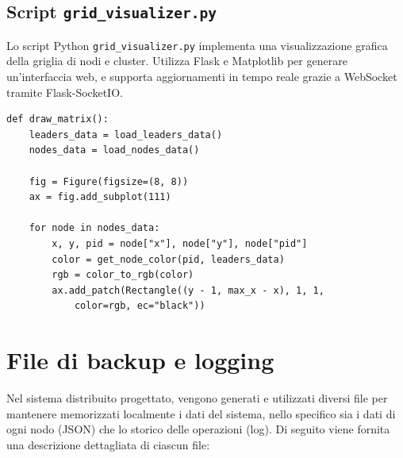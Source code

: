\documentclass[12pt, a4paper]{report}
\begin{document}
\subsection{Script \texttt{grid\_visualizer.py}}

Lo script Python \texttt{grid\_visualizer.py} implementa una visualizzazione grafica della griglia di nodi e cluster. Utilizza Flask e Matplotlib per generare un’interfaccia web, e supporta aggiornamenti in tempo reale grazie a WebSocket tramite Flask-SocketIO.

\begin{tcolorbox}[title=Visualizzazione della Matrice]
\begin{verbatim}
def draw_matrix():
    leaders_data = load_leaders_data()
    nodes_data = load_nodes_data()
    
    fig = Figure(figsize=(8, 8))
    ax = fig.add_subplot(111)
    
    for node in nodes_data:
        x, y, pid = node["x"], node["y"], node["pid"]
        color = get_node_color(pid, leaders_data)
        rgb = color_to_rgb(color)
        ax.add_patch(Rectangle((y - 1, max_x - x), 1, 1, 
            color=rgb, ec="black"))
\end{verbatim}
\end{tcolorbox}

\section{File di backup e logging}

Nel sistema distribuito progettato, vengono generati e utilizzati diversi file per mantenere memorizzati localmente i dati del sistema, nello specifico sia i dati di ogni nodo (JSON) che lo storico delle operazioni (log). Di seguito viene fornita una descrizione dettagliata di ciascun file:
\end{document}
